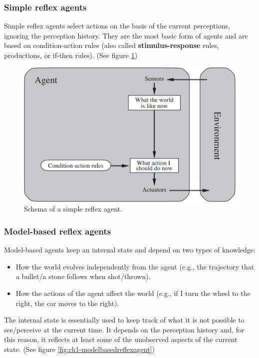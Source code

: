 \subsubsection{Simple reflex agents}
Simple reflex agents select actions on the basis of the current perceptions, ignoring the perception history. They are the most basic form of agents and are based on condition-action rules (also called \textbf{stimulus-response} rules, productions, or if-then rules). (See figure \ref{fig:ch1-simplereflexagent})

\begin{figure}[hbt]
    \centering
    \includegraphics[scale=0.35]{Images/Chapter 1/simple-reflex-agents.png}
    \caption{Schema of a simple reflex agent.}
    \label{fig:ch1-simplereflexagent}
\end{figure}

\subsubsection{Model-based reflex agents}
Model-based agents keep an internal state and depend on two types of knowledge:
\begin{itemize}
    \item How the world evolves independently from the agent (e.g., the trajectory that a bullet/a stone follows when shot/thrown).
    \item How the actions of the agent affect the world (e.g., if I turn the wheel to the right, the car moves to the right).
\end{itemize}
The internal state is essentially used to keep track of what it is not possible to see/perceive at the current time. It depends on the perception history and, for this reason, it reflects at least some of the unobserved aspects of the current state. (See figure \ref{fig:ch1-modelbasedreflexagent})

